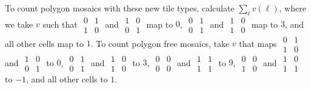 \documentclass[12pt]{article}
\theoremstyle{plain}
\theoremstyle{remark}
\theoremstyle{definition}
\theoremstyle{remark}
\theoremstyle{definition}
\begin{document}
\noindent To count polygon mosaics with these new tile types, calculate $\sum_\ell v(\ell)$, where we take $v$ such that $\begin{smallmatrix} 0 & 1 \\ 1 & 0 \end{smallmatrix}$ and $\begin{smallmatrix} 1 & 0 \\ 0 & 1 \end{smallmatrix}$ map to $0$, $\begin{smallmatrix} 0 & 1 \\ 0 & 1 \end{smallmatrix}$ and $\begin{smallmatrix} 1 & 0 \\ 1 & 0 \end{smallmatrix}$ map to $3$, and all other cells map to $1$. To count polygon free mosaics, take $v$ that maps $\begin{smallmatrix} 0 & 1 \\ 1 & 0 \end{smallmatrix}$ and $\begin{smallmatrix} 1 & 0 \\ 0 & 1 \end{smallmatrix}$ to $0$, $\begin{smallmatrix} 0 & 1 \\ 0 & 1 \end{smallmatrix}$ and $\begin{smallmatrix} 1 & 0 \\ 1 & 0 \end{smallmatrix}$ to $3$, $\begin{smallmatrix}0&0\\ 0&0\end{smallmatrix}$ and $\begin{smallmatrix}1&1\\ 1&1\end{smallmatrix}$ to $9$, $\begin{smallmatrix}0&0\\ 1&0\end{smallmatrix}$ and $\begin{smallmatrix}1&0\\ 1&1\end{smallmatrix}$ to $-1$, and all other cells to $1$.
\end{document}
